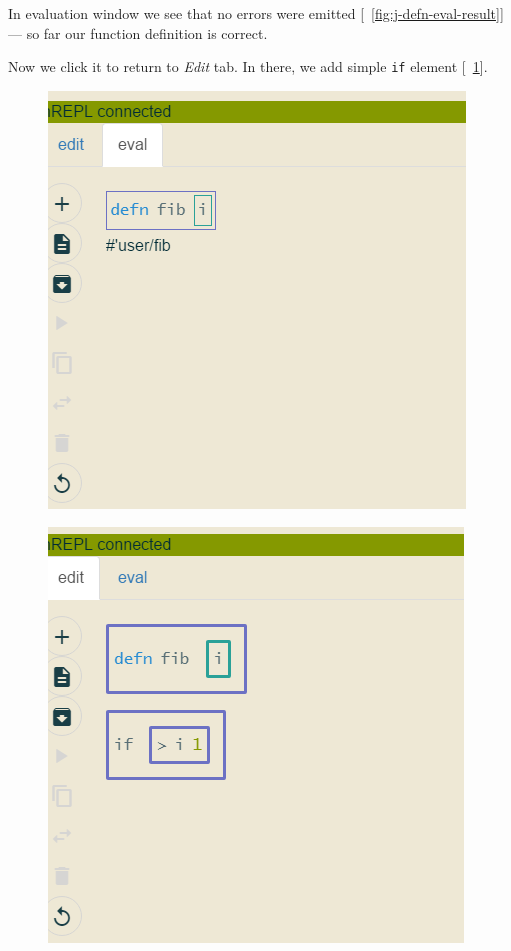 \documentclass[11pt]{scrartcl}
\newcommand*{\figref}[1]{[\textbf{\figurename}~\ref{#1}]}
\begin{document}
In evaluation window we see that no errors were emitted \figref{fig:j-defn-eval-result} --- so far our function
definition is correct.

Now we click it to return to \textit{Edit} tab. In there, we add simple
\lstinline{if} element \figref{fig:j-if}.

\begin{figure}[hbt]
  \centering
  \begin{minipage}{0.48\textwidth}
    \centering
    \includegraphics[scale=0.3]{img/j-defn-eval-result}
\label{fig:j-defn-eval-result}
  \end{minipage}
  \begin{minipage}{0.48\textwidth}
    \centering
    \includegraphics[scale=0.3]{img/j-if}
\label{fig:j-if}
  \end{minipage}
\end{figure}
\end{document}

